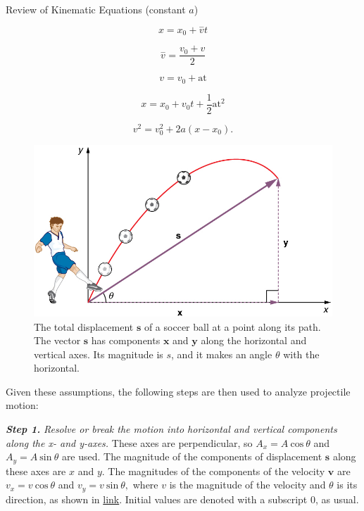 \documentclass[
]{book}
\newenvironment{note}{}{}
\begin{document}
\hypertarget{fs-id1767845}{}
\begin{note}

Review of Kinematic Equations (constant \(a\))

\leavevmode\hypertarget{eip-891}{}%
\[{{x =}x_{0}{+}\overset{-}{v}t}{}\]

\leavevmode\hypertarget{eip-557}{}%
\[{{\overset{-}{v} =}\frac{v_{0} + v}{2}}{}\]

\leavevmode\hypertarget{eip-405}{}%
\[{v = {v_{0} + \text{at}}}{}\]

\leavevmode\hypertarget{eip-556}{}%
\[{{x = {x_{0} + v_{0}}}{t + \frac{1}{2}}\text{at}^{2}}{}\]

\leavevmode\hypertarget{eip-389}{}%
\[{{v^{2} = {v_{0}^{2} + 2a}}({x - x_{0}})}\text{.}{}\]

\end{note}

\begin{figure}
\hypertarget{import-auto-id2242290}{%
\centering
\includegraphics{images/Figure_03_04_01.jpg}
\caption{The total displacement \(\mathbf{s}{}\) of a soccer ball at a point
along its path. The vector \(\mathbf{s}{}\) has components \(\mathbf{x}{}\)
and \(\mathbf{y}{}\) along the horizontal and vertical axes. Its magnitude
is \(s{}\), and it makes an angle \(\theta{}\) with the
horizontal.}\label{import-auto-id2242290}
}
\end{figure}

Given these assumptions, the following steps are then used to analyze
projectile motion:

\textbf{\emph{Step 1.}} \emph{Resolve or break the motion into horizontal and vertical
components along the x- and y-axes.} These axes are perpendicular, so
\({{A_{x} = A}\ \text{cos}\ \theta}{}\) and
\({{A_{y} = A}\ \text{sin}\ \theta}{}\) are used. The magnitude of the
components of displacement \(\mathbf{s}{}\) along these axes are \(x{}\) and
\({y.}{}\) The magnitudes of the components of the velocity \(\mathbf{v}{}\)
are \({{v_{x} = v}\ \text{cos}\ \theta}{}\) and
\({{v_{y} = v}\ \text{sin}\ {\theta,}}{}\) where \(v{}\) is the magnitude of
the velocity and \(\theta{}\) is its direction, as shown in
\protect\hyperlink{import-auto-id1815222}{link}. Initial values
are denoted with a subscript 0, as usual.
\end{document}
